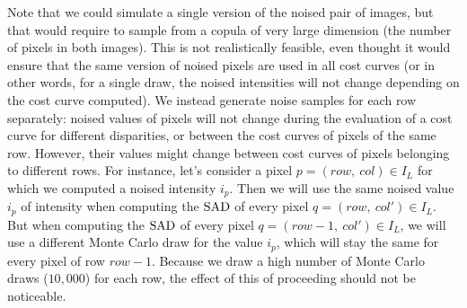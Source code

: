 Note that we could simulate a single version of the noised pair of images, but that would require to sample from a copula of very large dimension (the number of pixels in both images). This is not realistically feasible, even thought it would ensure that the same version of noised pixels are used in all cost curves (or in other words, for a single draw, the noised intensities will not change depending on the cost curve computed). We instead generate noise samples for each row separately: noised values of pixels will not change during the evaluation of a cost curve for different disparities, or between the cost curves of pixels of the same row. However, their values might change between cost curves of pixels belonging to different rows. For instance, let's consider a pixel $p=(row,~col)\in I_L$ for which we computed a noised intensity $i_p$. Then we will use the same noised value $i_p$ of intensity when computing the ${\mathrm{SAD}}$ of every pixel $q=(row,~col')\in I_L$. But when computing the ${\mathrm{SAD}}$ of every pixel $q=(row-1,~col')\in I_L$, we will use a different Monte Carlo draw for the value $i_p$, which will stay the same for every pixel of row $row-1$. Because we draw a high number of Monte Carlo draws ($10,000$) for each row, the effect of this of proceeding should not be noticeable. 

